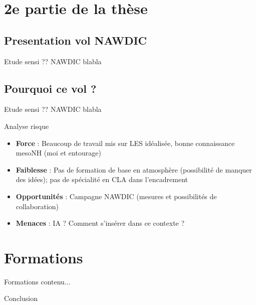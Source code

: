 \section{2e partie de la thèse}

\subsection{Presentation vol NAWDIC}
\begin{frame}{Etude sensi ??}
	NAWDIC blabla
\end{frame}


\subsection{Pourquoi ce vol ? }
\begin{frame}{Etude sensi ??}
	NAWDIC blabla
\end{frame}


\begin{frame}{Analyse risque}
	\vfill
	\begin{itemize}
		\item \textbf{Force} : Beaucoup de travail mis sur LES idéalisée, bonne connaissance mesoNH (moi et entourage)
		\item \textbf{Faiblesse} : Pas de formation de base en atmosphère (possibilité de manquer des idées); 
								pas de spécialité en CLA dans l'encadrement
		\item \textbf{Opportunités} : Campagne NAWDIC (mesures et possibilités de collaboration)
		\item \textbf{Menaces} : IA ? Comment s'insérer dans ce contexte ? 
	\end{itemize}
\end{frame}


\section{Formations}
\begin{frame}{Formations}
	contenu...
\end{frame}

\begin{frame}{Conclusion}
	\printbibliography
\end{frame}

   
